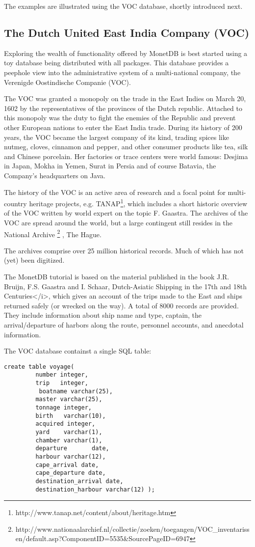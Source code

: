\documentclass[10pt,twocolumn,fleqn]{article}
\begin{document}
The examples are illustrated using the VOC database, shortly introduced
next.
\subsection{The Dutch United East India Company (VOC)}
Exploring the wealth of functionality offered by MonetDB is best
started using a toy database being distributed with all packages.
This database provides a peephole view into the administrative
system of a multi-national company, the Verenigde Oostindische Companie (VOC).

The VOC was granted a monopoly on the trade in the East Indies on March 20, 1602
by the representatives of the provinces of the Dutch republic.
Attached to this monopoly was the duty to fight the enemies of the Republic and 
prevent other European nations to enter the East India trade.
During its history of 200 years, the VOC became the largest company of its kind, 
trading spices like nutmeg, cloves, cinnamon and pepper, and other consumer 
products like tea, silk and Chinese porcelain.
Her factories or trace centers were world famous: Desjima in Japan, 
Mokha in Yemen, Surat in Persia and of course Batavia, 
the Company's headquarters on Java.

The history of the VOC is an active area of research and
a focal point for multi-country heritage projects, e.g. 
TANAP\footnote{http://www.tanap.net/content/about/heritage.htm},
which includes a short historic overview of the VOC written by
world expert on the topic F. Gaastra.
The archives of the VOC are spread around the world, but a large
contingent still resides in the 
National Archive
\footnote{ http://www.nationaalarchief.nl/collectie/zoeken/toegangen/VOC\_inventarissen/default.asp?ComponentID=5535\&SourcePageID=6947 }
, The Hague.

The archives comprise over 25 million historical records.
Much of which has not (yet) been digitized.

The MonetDB tutorial is based on the material published in the book 
J.R. Bruijn, F.S. Gaastra and I. Schaar, Dutch-Asiatic Shipping in the 17th and 18th Centuries</i>, which
gives an account of the trips made to the East and ships returned safely
(or wrecked on the way). A total of 8000 records are provided. 
They include information about ship name and type, captain,
the arrival/departure of harbors along the route, personnel accounts, 
and anecdotal information.

The VOC database containst a single SQL table:
{\footnotesize
\begin{verbatim}
create table voyage(
         number integer,
         trip   integer,
          boatname varchar(25),
         master varchar(25),
         tonnage integer,
         birth   varchar(10),
         acquired integer,
         yard    varchar(1),
         chamber varchar(1),
         departure       date,
         harbour varchar(12),
         cape_arrival date,
         cape_departure date,
         destination_arrival date,
         destination_harbour varchar(12) );
\end{verbatim}
}
\end{document}
